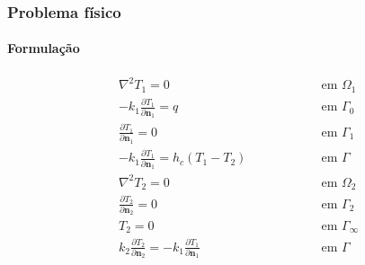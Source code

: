 \documentclass{beamer}
\begin{document}
\begin{frame}
	\frametitle{Problema físico}
	\framesubtitle{Formulação}
	\begin{subequations}
		\begin{alignat*}{2}
		& \nabla^2 T_1 = 0 \quad\quad\quad\quad && \text{ em } \Omega_1  \\ 
		& -k_1 \frac{\partial T_1}{\partial\mathbf{n}_1} = q && \text{ em } \Gamma_0   \\ 
		& \frac{\partial T_1}{\partial \mathbf{n}_1} = 0 && \text{ em }  \Gamma_1 \\ 
		& -k_1 \frac{\partial T_1}{\partial\mathbf{n}_1} = h_c(T_1-T_2) \quad\quad\quad\quad && \text{ em }  \Gamma \\ 
		& \nabla^2 T_2 = 0 && \text{ em }  \Omega_2\\ 
		& \frac{\partial T_2}{\partial \mathbf{n}_2} = 0 && \text{ em }  \Gamma_2 \\
		& T_2 = 0 && \text{ em }  \Gamma_\infty  \\ 
		& k_2\frac{\partial T_2}{\partial\mathbf{n}_2} = - k_1\frac{\partial T_1}{\partial\mathbf{n}_1} && \text{ em }  \Gamma 
		\end{alignat*}
	\end{subequations}
\end{frame}
\end{document}
